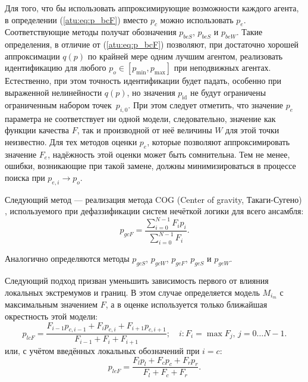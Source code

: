 Для того, что бы использовать аппроксимирующие возможности каждого агента,
в определении (\ref{atu:eq:p_bcF}) вместо $p_c$ можно использовать $p_e$.
Соответствующие методы получат обозначения
$p_{beS}$, $p_{beS}$ и $p_{beW}$.
Такие определения, в отличие от (\ref{atu:eq:p_bcF}) позволяют,
при достаточно хорошей аппроксимации $q(p)$
по крайней мере одним лучшим агентом, реализовать идентификацию
для любого $p_o \in [p_{\min}, p_{\max}]$ при неподвижных агентах.
Естественно, при этом точность идентификации будет падать,
особенно при выраженной нелинейности $q(p)$, но значения $p_\mathrm{id}$
не будут ограничены ограниченным набором точек~$p_{i,0}$.
При этом следует отметить, что
значение $p_e$
параметра не соответствует ни одной модели,
следовательно,
значение как функции качества $F$,
так и производной от неё величины $W$
для этой точки неизвестно.
Для тех методов оценки $p_e$, которые позволяют аппроксимировать
значение $F_e$, надёжность этой оценки может быть сомнительна.
Тем не менее, ошибки, возникающие при такой замене,
должны минимизироваться в процессе поиска при $p_{e,i} \to p_o$.


Следующий метод --- реализация
метода COG (Center of gravity, Такаги-Сугено) \cite{atu_asau25,atu_csit2015,atu_asau16},
используемого при дефаззификации систем нечёткой логики для всего ансамбля:
%
\begin{equation}
  p_{gcF}
  =
  \frac{\sum\limits_{i=0}^{N-1} F_{i} p_{i}}
       {\sum\limits_{i=0}^{N-1} F_{i} }
  .
  \label{atu:eq:p_gcF}
\end{equation}

Аналогично определяются методы
$p_{gcS}$,
$p_{gcW}$,
$p_{geF}$,
$p_{geS}$ и
$p_{geW}$.


Следующий подход призван уменьшить зависимость первого
от влияния локальных экстремумов и границ. В этом
случае определяется модель $M_{i_{m}}$ с максимальным значением
$F$, а в оценке используется только ближайшая окрестность этой модели:
%
\begin{equation}
  p_{lcF}
  =
  \frac{ F_{i-1} p_{c,i-1} + F_{i} p_{c,i} + F_{i+1} p_{c,i+1} }
       { F_{i-1}           + F_{i}         + F_{i+1}         }
  ;
  \quad
  i : F_i = \max{F_j}, \, j=0 \ldots N-1 .
  \label{atu:eq:p_lcF}
\end{equation}
%
или, с учётом введённых локальных обозначений при $i=c$:
%
\begin{equation}
  p_{leF}
  =
  \frac{ F_{l} p_{l} + F_{c} p_{c} + F_{r} p_{r} }
       { F_{l}       + F_{c}       + F_{r}       }
  .
  \label{atu:eq:p_lcFl}
\end{equation}

